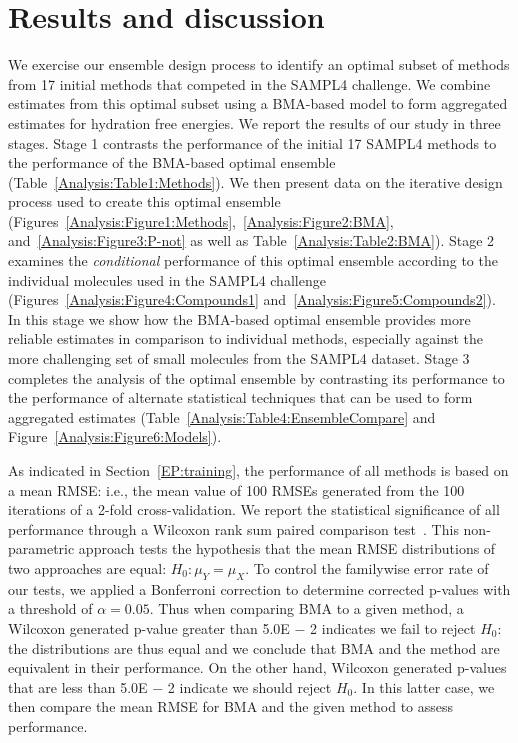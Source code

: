 \documentclass[12pt]{article}
\newcommand{\+}[1]{\ensuremath{\mathbf{#1}}}
\begin{document}
\section{Results and discussion}
\label{Results}
We exercise our ensemble design process to identify an optimal subset of methods from 17 initial methods that competed in the SAMPL4 challenge. We combine estimates from this optimal subset using a BMA-based model to form aggregated estimates for hydration free energies. We report the results of our study in three stages. Stage 1 contrasts the performance of the initial 17 SAMPL4 methods to the performance of the BMA-based optimal ensemble (Table~\ref{Analysis:Table1:Methods}). We then present data on the iterative design process used to create this optimal ensemble (Figures~\ref{Analysis:Figure1:Methods},~\ref{Analysis:Figure2:BMA}, and~\ref{Analysis:Figure3:P-not} as well as Table~\ref{Analysis:Table2:BMA}). Stage 2 examines the \emph{conditional} performance of this optimal ensemble according to the individual molecules used in the SAMPL4 challenge (Figures~\ref{Analysis:Figure4:Compounds1} and~\ref{Analysis:Figure5:Compounds2}). In this stage we show how the BMA-based optimal ensemble provides more reliable estimates in comparison to individual methods, especially against the more challenging set of small molecules from the SAMPL4 dataset. Stage 3 completes the analysis of the optimal ensemble by contrasting its performance to the performance of alternate statistical techniques that can be used to form aggregated estimates (Table~\ref{Analysis:Table4:EnsembleCompare} and Figure~\ref{Analysis:Figure6:Models}). 

As indicated in Section~\ref{EP:training}, the performance of all methods is based on a mean RMSE: i.e., the mean value of 100 RMSEs generated from the 100 iterations of a 2-fold cross-validation. We report the statistical significance of all performance through a Wilcoxon rank sum paired comparison test~\cite{Wilcoxon:45}. This non-parametric approach tests the hypothesis that the mean RMSE distributions of two approaches are equal: $H_0 : \mu_Y = \mu_X$. To control the familywise error rate of our tests, we applied a Bonferroni correction to determine corrected p-values with a threshold of $\alpha = 0.05$. Thus when comparing BMA to a given method, a Wilcoxon generated p-value greater than 5.0E $-$ 2 indicates we fail to reject $H_0$: the distributions are thus equal and we conclude that BMA and the method are equivalent in their performance. On the other hand, Wilcoxon generated p-values that are less than 5.0E $-$ 2 indicate we should reject $H_0$. In this latter case, we then compare the mean RMSE for BMA and the given method to assess performance.
\end{document}
